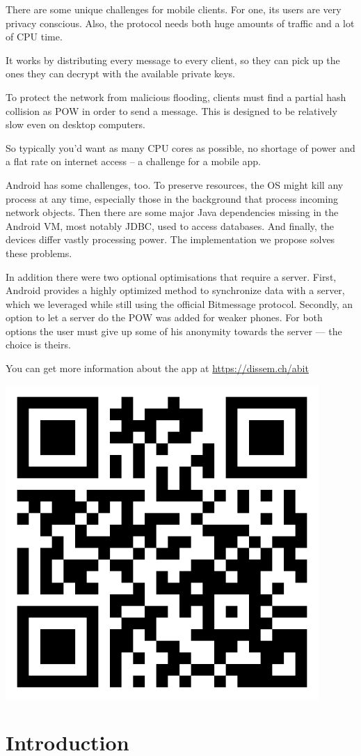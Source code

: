 \documentclass{bfh}
\begin{document}
  There are some unique challenges for mobile clients. For one, its users are very privacy conscious. Also, the protocol needs both huge amounts of traffic and a lot of \acs{CPU} time.

  It works by distributing every message to every client, so they can pick up the ones they can decrypt with the available private keys.

  To protect the network from malicious flooding, clients must find a partial hash collision as \acl{POW} in order to send a message. This is designed to be relatively slow even on desktop computers.

  So typically you'd want as many \acs{CPU} cores as possible, no shortage of power and a flat rate on internet access – a challenge for a mobile app.

  Android\texttrademark{} has some challenges, too. To preserve resources, the \acl{OS} might kill any process at any time, especially those in the background that process incoming network objects. Then there are some major Java dependencies missing in the Android \acs{VM}, most notably \acs{JDBC}, used to access databases. And finally, the devices differ vastly processing power. The implementation we propose solves these problems.

  In addition there were two optional optimisations that require a server. First, Android provides a highly optimized method to synchronize data with a server, which we leveraged while still using the official Bitmessage protocol. Secondly, an option to let a server do the \acl{POW} was added for weaker phones. For both options the user must give up some of his anonymity towards the server --- the choice is theirs.

  You can get more information about the app at \url{https://dissem.ch/abit}

  \begin{center}
    \includegraphics[width=0.2 \textwidth]{images/QR_abit_webpage.pdf}
  \end{center}


  \newpage
  \tableofcontents


  \newpage
  \section{Introduction}
\end{document}
